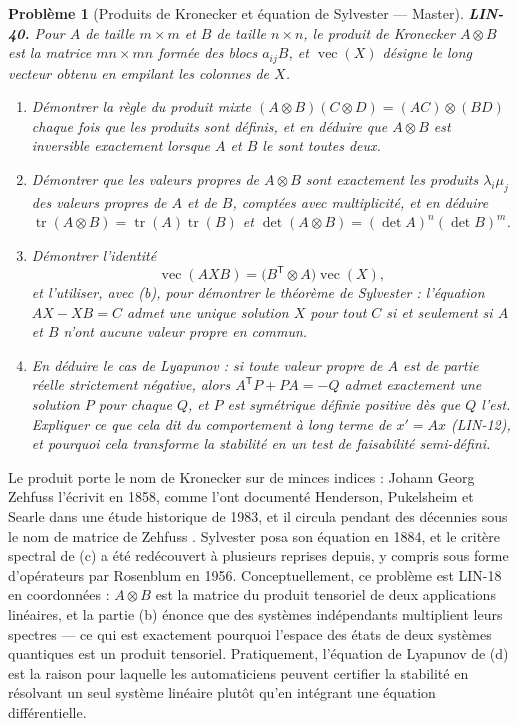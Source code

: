 \documentclass[11pt]{article}
\newtheorem{problem}{Problème}
\begin{document}
\begin{problem}[{Produits de Kronecker et équation de Sylvester --- Master}]
\textbf{LIN-40.} Pour $A$ de taille $m \times m$ et $B$ de taille $n \times n$, le
\textit{produit de Kronecker} $A \otimes B$ est la matrice $mn \times mn$ formée des blocs
$a_{ij}B$, et $\operatorname{vec}(X)$ désigne le long vecteur obtenu en empilant les colonnes de
$X$.
\begin{enumerate}
\item[(a)] Démontrer la règle du produit mixte $(A \otimes B)(C \otimes D) = (AC) \otimes (BD)$ chaque fois
que les produits sont définis, et en déduire que $A \otimes B$ est inversible exactement lorsque
$A$ et $B$ le sont toutes deux.
\item[(b)] Démontrer que les valeurs propres de $A \otimes B$ sont exactement les produits
$\lambda_i \mu_j$ des valeurs propres de $A$ et de $B$, comptées avec multiplicité, et en
déduire $\operatorname{tr}(A \otimes B) = \operatorname{tr}(A)\operatorname{tr}(B)$ et
$\det(A \otimes B) = (\det A)^{n} (\det B)^{m}$.
\item[(c)] Démontrer l'identité
\[ \operatorname{vec}(AXB) = \big(B^{\mathsf{T}} \otimes A\big)\operatorname{vec}(X), \]
et l'utiliser, avec (b), pour démontrer le théorème de Sylvester : l'équation $AX - XB = C$ admet une
unique solution $X$ pour tout $C$ si et seulement si $A$ et $B$ n'ont aucune valeur propre en
commun.
\item[(d)] En déduire le cas de Lyapunov : si toute valeur propre de $A$ est de partie réelle strictement
négative, alors $A^{\mathsf{T}}P + PA = -Q$ admet exactement une solution $P$ pour chaque $Q$, et
$P$ est symétrique définie positive dès que $Q$ l'est. Expliquer ce que cela dit du comportement à
long terme de $x' = Ax$ (LIN-12), et pourquoi cela transforme la \og{} stabilité \fg{} en un test de
faisabilité semi-défini.
\end{enumerate}

\end{problem}

\noindent Le produit porte le nom de Kronecker sur de minces indices : Johann Georg Zehfuss
l'écrivit en 1858, comme l'ont documenté Henderson, Pukelsheim et Searle dans une étude historique de
1983, et il circula pendant des décennies sous le nom de \og{} matrice de Zehfuss \fg{}. Sylvester posa son
équation en 1884, et le critère spectral de (c) a été redécouvert à plusieurs reprises depuis, y
compris sous forme d'opérateurs par Rosenblum en 1956. Conceptuellement, ce problème est LIN-18 en
coordonnées : $A \otimes B$ est la matrice du produit tensoriel de deux applications linéaires, et
la partie (b) énonce que des systèmes indépendants multiplient leurs spectres --- ce qui est exactement
pourquoi l'espace des états de deux systèmes quantiques est un produit tensoriel. Pratiquement,
l'équation de Lyapunov de (d) est la raison pour laquelle les automaticiens peuvent certifier la
stabilité en résolvant un seul système linéaire plutôt qu'en intégrant une équation
différentielle.
\end{document}
